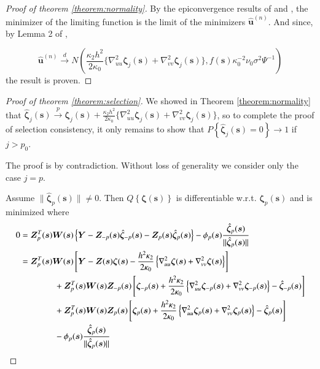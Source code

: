 \documentclass[authoryear, review, 11pt]{elsarticle}
\begin{document}
\begin{proof}[Proof of theorem \ref{theorem:normality}]
            By the epiconvergence results of \cite{Geyer-1994} and \cite{Knight-Fu-2000}, the minimizer of the limiting function is the limit of the minimizers $\hat{\bm{u}}^{(n)}$. And since, by Lemma 2 of \cite{Sun-Yan-Zhang-Lu-2014}, 

            \begin{equation}
                \hat{\bm{u}}^{(n)} \xrightarrow{d} N \left(\frac{\kappa_2 h^2}{2 \kappa_0} \{ \nabla_{uu}^2 \bm{\zeta}_j (\bm{s}) + \nabla_{vv}^2 \bm{\zeta}_j (\bm{s}) \}, f(\bm{s}) \kappa_0^{-2} \nu_0 \sigma^2 \Psi^{-1} \right)
            \end{equation}
            the result is proven.
        \end{proof}

        \begin{proof}[Proof of theorem \ref{theorem:selection}] 
            We showed in Theorem \ref{theorem:normality} that $\hat{\bm{\zeta}}_j (\bm{s}) \xrightarrow{p} \bm{\zeta}_j (\bm{s}) + \frac{\kappa_2 h^2}{2 \kappa_0} \{ \nabla_{uu}^2 \bm{\zeta}_j (\bm{s}) + \nabla_{vv}^2 \bm{\zeta}_j (\bm{s}) \}$, so to complete the proof of selection consistency, it only remains to show that $P \left\{ \hat{\bm{\zeta}}_j (\bm{s}) = 0 \right\} \to 1$ if $j > p_0$.
            
            The proof is by contradiction. Without loss of generality we consider only the case $j=p$.

            Assume $\| \hat{\bm{\zeta}}_p(\bm{s}) \| \ne 0$. Then $Q \left\{ \bm{\zeta}(\bm{s}) \right\}$ is differentiable w.r.t. $\bm{\zeta}_p(\bm{s})$ and is minimized where
            \begin{align}
                0 &= \bm{Z}_p^T(\bm{s}) \bm{W}(\bm{s}) \left\{ \bm{Y} - \bm{Z}_{-p}(\bm{s}) \hat{\bm{\zeta}}_{-p}(\bm{s}) - \bm{Z}_p(\bm{s}) \hat{\bm{\zeta}}_p(\bm{s}) \right\} - \phi_p(\bm{s}) \frac{ \hat{\bm{\zeta}}_p(\bm{s}) }{\| \hat{\bm{\zeta}}_p(\bm{s}) \|} \notag \\
                &= \bm{Z}_p^T(\bm{s}) \bm{W}(\bm{s}) \left[ \bm{Y} - \bm{Z}(\bm{s}) \bm{\zeta}(\bm{s}) - \frac{h^2 \kappa_2}{2 \kappa_0} \left\{ \nabla^2_{uu} \bm{\zeta}(\bm{s}) + \nabla^2_{vv} \bm{\zeta}(\bm{s}) \right\} \right] \notag \\
                &\mkern+72mu+ \bm{Z}_p^T(\bm{s}) \bm{W}(\bm{s}) \bm{Z}_{-p}(\bm{s}) \left[ \bm{\zeta}_{-p}(\bm{s}) + \frac{h^2 \kappa_2}{2 \kappa_0} \left\{ \nabla^2_{uu} \bm{\zeta}_{-p}(\bm{s}) + \nabla^2_{vv} \bm{\zeta}_{-p}(\bm{s}) \right\} - \hat{\bm{\zeta}}_{-p}(\bm{s}) \right] \notag \\
                &\mkern+72mu+ \bm{Z}_p^T(\bm{s}) \bm{W}(\bm{s}) \bm{Z}_p(\bm{s}) \left[ \bm{\zeta}_p(\bm{s}) + \frac{h^2 \kappa_2}{2 \kappa_0} \left\{ \nabla^2_{uu} \bm{\zeta}_p(\bm{s}) + \nabla^2_{vv} \bm{\zeta}_p(\bm{s}) \right\} - \hat{\bm{\zeta}}_p(\bm{s}) \right]  \notag \\
                &\mkern+72mu- \phi_p(\bm{s}) \frac{ \hat{\bm{\zeta}}_p(\bm{s}) }{\| \hat{\bm{\zeta}}_p(\bm{s}) \|} \notag \\
            \end{align}
        

\end{proof}
\end{document}
